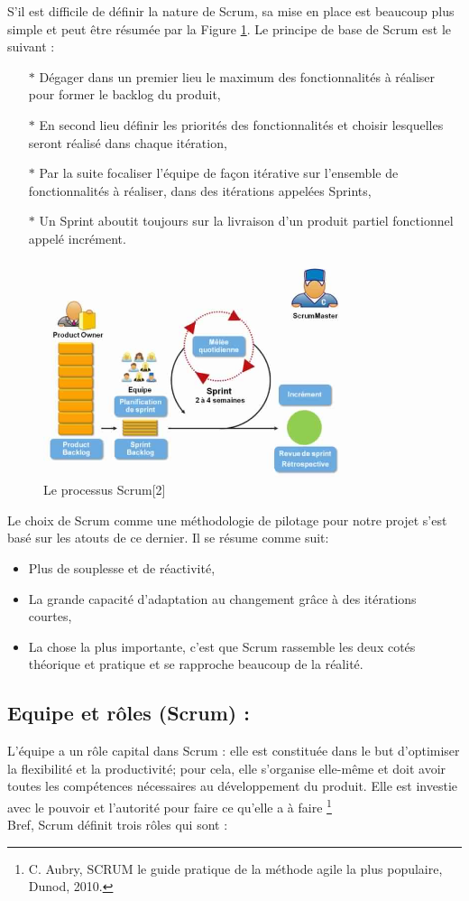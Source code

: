 \documentclass{article}
\begin{document}
S’il est difficile de définir la nature de Scrum, sa mise en place est beaucoup plus simple et peut être résumée par la Figure \ref{fig:pic8}. Le principe de base de Scrum est le suivant :
\begin{itemize}
\item[$\ast$] Dégager dans un premier lieu le maximum des fonctionnalités à réaliser pour former le backlog du produit,
\item[$\ast$] En second lieu définir les priorités des fonctionnalités et choisir lesquelles seront réalisé dans chaque itération,
\item[$\ast$]Par la suite focaliser l'équipe de façon itérative sur l’ensemble de fonctionnalités à réaliser, dans des itérations appelées Sprints,
\item[$\ast$]Un Sprint aboutit toujours sur la livraison d’un produit partiel fonctionnel appelé incrément.
\end{itemize}
\begin{figure}[H]
\centering
\includegraphics[height=2.5in]{methode-scrum.jpg}
\caption[Figure8 : Le processus Scrum]{Le processus Scrum[2]}
\label{fig:pic8}
\end{figure}
Le choix de Scrum comme une méthodologie de pilotage pour notre projet s’est basé sur les atouts de ce dernier. Il se résume comme suit:
\begin{itemize}
\item Plus de souplesse et de réactivité,
\item La grande capacité d’adaptation au changement grâce à des itérations courtes,
\item La chose la plus importante, c’est que Scrum rassemble les deux cotés théorique et pratique et se rapproche beaucoup de la réalité.
\end{itemize}
\subsection*{Equipe et rôles (Scrum) : }
\guillemotleft L’équipe a un rôle capital dans Scrum : elle est constituée dans le but d’optimiser la flexibilité et la productivité; pour cela, elle s’organise elle-même et doit avoir toutes les compétences nécessaires au développement du produit. Elle est investie avec le pouvoir et l’autorité pour faire ce qu’elle a à faire \guillemotright \footnote{C. Aubry, SCRUM le guide pratique de la méthode agile la plus populaire, Dunod, 2010.}\\
Bref, Scrum définit trois rôles qui sont : 
\end{document}

